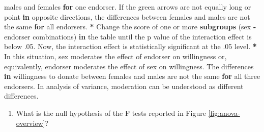 \documentclass[a4paper]{book}
\newenvironment{Shaded}{\begin{snugshade}}{\end{snugshade}}
\newcommand{\KeywordTok}[1]{\textcolor[rgb]{0,0,0}{\textbf{#1}}}
\newcommand{\DecValTok}[1]{\textcolor[rgb]{0.00,0.00,0.00}{#1}}
\newcommand{\StringTok}[1]{\textcolor[rgb]{0.00,0.00,0.00}{#1}}
\newcommand{\ControlFlowTok}[1]{\textcolor[rgb]{0.00,0.00,0.00}{\textbf{#1}}}
\newcommand{\OperatorTok}[1]{\textcolor[rgb]{0.00,0.00,0.00}{\textbf{#1}}}
\newcommand{\NormalTok}[1]{#1}
\providecommand{\tightlist}{%
  \setlength{\itemsep}{0pt}\setlength{\parskip}{0pt}}
\theoremstyle{definition}
\theoremstyle{definition}
\theoremstyle{definition}
\theoremstyle{remark}
\begin{document}
\begin{Shaded}
\begin{Highlighting}[]
\NormalTok{males and females }\ControlFlowTok{for}\NormalTok{ one endorser. If the green arrows are not equally long}
\NormalTok{or point }\ControlFlowTok{in}\NormalTok{ opposite directions, the differences between females and males are}
\NormalTok{not the same }\ControlFlowTok{for}\NormalTok{ all endorsers.}
\OperatorTok{*}\StringTok{ }\NormalTok{Change the score of one or more }\KeywordTok{subgroups}\NormalTok{ (sex }\OperatorTok{-}\StringTok{ }\NormalTok{endorser combinations) }\ControlFlowTok{in}
\NormalTok{the table until the p value of the interaction effect is below .}\DecValTok{05}\NormalTok{. Now, the}
\NormalTok{interaction effect is statistically significant at the .}\DecValTok{05}\NormalTok{ level.}
\OperatorTok{*}\StringTok{ }\NormalTok{In this situation, sex moderates the effect of endorser on willingness or,}
\NormalTok{equivalently, endorser moderates the effect of sex on willingness. The}
\NormalTok{differences }\ControlFlowTok{in}\NormalTok{ willingness to donate between females and males are not the}
\NormalTok{same }\ControlFlowTok{for}\NormalTok{ all three endorsers. In analysis of variance, moderation can be}
\NormalTok{understood as different differences.}
\end{Highlighting}
\end{Shaded}

\begin{enumerate}
\def\labelenumi{\arabic{enumi}.}
\setcounter{enumi}{2}
\tightlist
\item
  What is the null hypothesis of the F tests reported in Figure
  \ref{fig:anova-overview}?
\end{enumerate}
\end{document}
